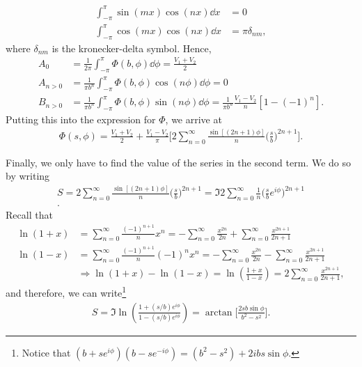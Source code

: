 {\begin{align}
    \int_{-\pi}^{\pi} \sin(mx)\cos(nx) \dd{x} &= 0 \\
    \int_{-\pi}^{\pi} \cos(mx)\cos(nx) \dd{x} &= \pi \delta_{nm}
,\end{align}
where $\delta_{nm}$ is the kronecker-delta symbol.
Hence,
\begin{align}
    A_0 &= \frac{1}{2\pi} \int_{-\pi}^{\pi} \Phi(b,\phi) \dd{\phi} = \frac{V_1 + V_2}{2} \\
    A_{n>0} &= \frac{1}{\pi b^{n}} \int_{-\pi}^{\pi} \Phi(b,\phi) \cos(n\phi) \dd{\phi} = 0 \\
    B_{n>0} &= \frac{1}{\pi b^{n}} \int_{-\pi}^{\pi} \Phi(b,\phi) \sin(n\phi) \dd{\phi} = \frac{1}{\pi b^{n}} \frac{V_1 - V_2}{n} [1 - (-1)^{n}]
.\end{align}
Putting this into the expression for $\Phi$, we arrive at
\begin{eqnarray}
    \Phi(s,\phi) = \frac{V_1 + V_2}{2} + \frac{V_1 - V_2}{\pi} \Bigg[ 2 \sum_{n=0}^{\infty} \frac{\sin[(2n+1)\phi]}{n} \Big( \frac{s}{b} \Big)^{2n+1} \Bigg]
.\end{eqnarray}

Finally, we only have to find the value of the series in the second term.
We do so by writing
\begin{eqnarray}
    S = 2\sum_{n=0}^{\infty} \frac{\sin[(2n+1) \phi]}{n} \Big( \frac{s}{b} \Big)^{2n+1} = \Im{ 2\sum_{n=0}^{\infty} \frac{1}{n} \Big( \frac{s}{b} e^{i\phi} \Big)^{2n+1} } \\
.\end{eqnarray}
Recall that
\begin{align}
    \ln(1 + x) &= \sum_{n=0}^{\infty} \frac{(-1)^{n+1}}{n} x^{n} = -\sum_{n=0}^{\infty} \frac{x^{2n}}{2n} + \sum_{n=0}^{\infty} \frac{x^{2n+1}}{2n+1} \\
    \ln(1 - x) &= \sum_{n=0}^{\infty} \frac{(-1)^{n+1}}{n} (-1)^{n} x^{n} = -\sum_{n=0}^{\infty} \frac{x^{2n}}{2n} - \sum_{n=0}^{\infty} \frac{x^{2n+1}}{2n+1} \\
    &\Rightarrow \ln(1 + x) - \ln(1 - x) =\ln( \frac{1 + x}{1-x} ) = 2 \sum_{n=0}^{\infty} \frac{x^{2n+1}}{2n + 1}
,\end{align}
and therefore, we can write\footnote{Notice that $(b+s e^{i\phi})(b - s e^{-i\phi}) = (b^2 - s^2) + 2i b s \sin{\phi}$.}
\begin{eqnarray}
    S = \Im{ \ln( \frac{1 + (s/b)e^{i\phi}}{1 - (s/b)e^{i\phi}} ) } = \arctan\Bigg[ \frac{2 s b \sin{\phi}}{b^2 - s^2} \Bigg]
.\end{eqnarray}

}

